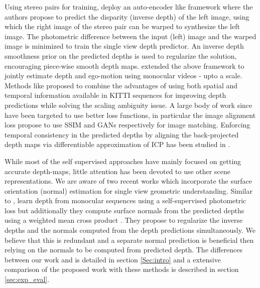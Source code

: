 \documentclass[letterpaper, 10 pt, conference]{ieeeconf}
\begin{document}
Using stereo pairs for training,  \cite{garg2016depth}\cite{godard2016depth} deploy an auto-encoder like framework where the authors propose to predict the disparity (inverse depth) of the left image, using which the right image of the stereo pair can be warped to synthesize the left image. The photometric difference between the input (left) image and the warped image is minimized to train the single view depth predictor. An inverse depth smoothness prior on the predicted depths is used to regularize the solution, encouraging piece-wise smooth depth maps.
\cite{zhou2017sfmlearner} extended the above framework to jointly estimate depth and ego-motion using monocular videos - upto a scale. Methods like \cite{li2017undeepvo}\cite{zhan2018depthVO} proposed to combine the advantages of using both spatial and temporal information available in KITTI sequences for improving depth predictions while solving the scaling ambiguity issue. A large body of work since have been targeted to use better loss functions, in particular the image alignment loss \cite{godard2016depth,aleottigenerative} propose to use SSIM and GANs respectively for image matching. Enforcing temporal consistency in the predicted depths by aligning the back-projected depth maps via differentiable approximation of ICP has been studied in \cite{mahjourian2018unsupervised}.





While most of the self supervised approaches have mainly focused on getting accurate depth-maps, little attention has been devoted to use other scene representations.  
We are aware of two recent  works \cite{yang2017depthnormal,yang2018lego} which incorporate the surface orientation (normal) estimation for single view geometric understanding. 
Similar to \cite{zhou2017sfmlearner}, \cite{yang2017depthnormal}\cite{yang2018lego} learn depth from monocular sequences using a self-supervised photometric loss but additionally  they compute surface normals from the predicted depths using a weighted mean cross product \cite{jia2006crossproduct}. They propose to regularize the inverse depths and the normals computed from the depth predictions simultaneously. We believe that this is redundant and a separate normal prediction is beneficial then relying on the normals to be computed from predicted depth. The differences between our work and \cite{yang2017depthnormal,yang2018lego} is detailed in section \ref{Sec:intro} and a extensive comparison of the proposed work with these methods is described in section \ref{sec:exp_eval}.
\end{document}
